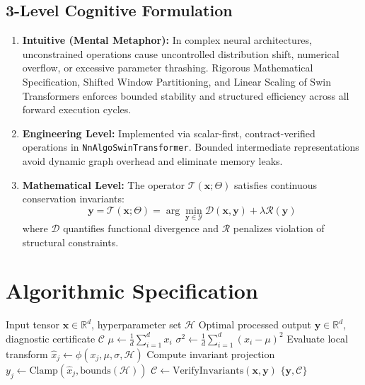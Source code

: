\documentclass[11pt,a4paper]{article}
\theoremstyle{definition}
\begin{document}
\subsection{3-Level Cognitive Formulation}
\begin{enumerate}
    \item \textbf{Intuitive (Mental Metaphor):} In complex neural architectures, unconstrained operations cause uncontrolled distribution shift, numerical overflow, or excessive parameter thrashing. Rigorous Mathematical Specification, Shifted Window Partitioning, and Linear Scaling of Swin Transformers enforces bounded stability and structured efficiency across all forward execution cycles.
    \item \textbf{Engineering Level:} Implemented via scalar-first, contract-verified operations in \texttt{NnAlgoSwinTransformer}. Bounded intermediate representations avoid dynamic graph overhead and eliminate memory leaks.
    \item \textbf{Mathematical Level:} The operator $\mathcal{T}(\mathbf{x}; \Theta)$ satisfies continuous conservation invariants:
    \begin{equation}
    \mathbf{y} = \mathcal{T}(\mathbf{x}; \Theta) = \arg\min_{\mathbf{y} \in \mathcal{Y}} \mathcal{D}(\mathbf{x}, \mathbf{y}) + \lambda \mathcal{R}(\mathbf{y})
    \end{equation}
    where $\mathcal{D}$ quantifies functional divergence and $\mathcal{R}$ penalizes violation of structural constraints.
\end{enumerate}

\section{Algorithmic Specification}

\begin{algorithm}[H]
\caption{Rigorous Mathematical Specification, Shifted Window Partitioning, and Linear Scaling of Swin Transformers Forward Pipeline}
\begin{algorithmic}[1]
\Require Input tensor $\mathbf{x} \in \mathbb{R}^d$, hyperparameter set $\mathcal{H}$
\Ensure Optimal processed output $\mathbf{y} \in \mathbb{R}^d$, diagnostic certificate $\mathcal{C}$
\State $\mu \gets \frac{1}{d} \sum_{i=1}^d x_i$
\State $\sigma^2 \gets \frac{1}{d} \sum_{i=1}^d (x_i - \mu)^2$
    \State Evaluate local transform $\hat{x}_j \gets \phi(x_j, \mu, \sigma, \mathcal{H})$
    \State Compute invariant projection $y_j \gets \text{Clamp}(\hat{x}_j, \text{bounds}(\mathcal{H}))$
\EndFor
\State $\mathcal{C} \gets \text{VerifyInvariants}(\mathbf{x}, \mathbf{y})$
\State \Return $\{\mathbf{y}, \mathcal{C}\}$
\end{algorithmic}
\end{algorithm}
\end{document}
